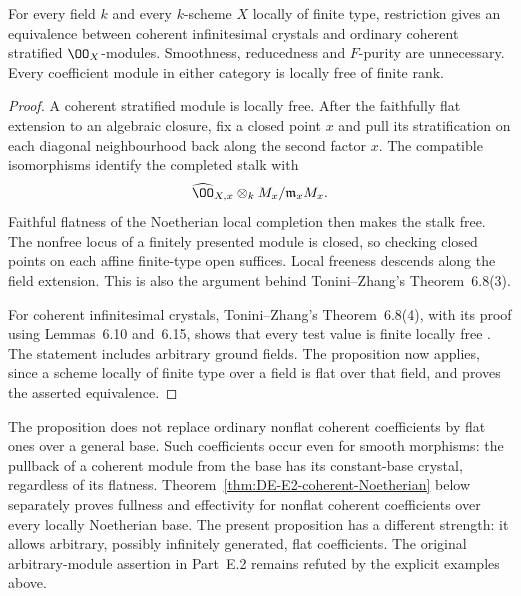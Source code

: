 \begin{corollary}\label{cor:DE-E2-coherent-any-field}
For every field $k$ and every $k$-scheme $X$ locally of finite type, restriction gives an equivalence between coherent infinitesimal crystals and ordinary coherent stratified $\OO_X$-modules.  Smoothness, reducedness and $F$-purity are unnecessary.  Every coefficient module in either category is locally free of finite rank.
\end{corollary}
\begin{proof}
A coherent stratified module is locally free.  After the faithfully flat extension to an algebraic closure, fix a closed point $x$ and pull its stratification on each diagonal neighbourhood back along the second factor $x$.  The compatible isomorphisms identify the completed stalk with
\[
        \widehat{\OO}_{X,x}\otimes_k M_x/\mathfrak m_xM_x.
\]
Faithful flatness of the Noetherian local completion then makes the stalk free.  The nonfree locus of a finitely presented module is closed, so checking closed points on each affine finite-type open suffices.  Local freeness descends along the field extension.  This is also the argument behind Tonini--Zhang's Theorem~6.8(3).

For coherent infinitesimal crystals, Tonini--Zhang's Theorem~6.8(4), with its proof using Lemmas~6.10 and~6.15, shows that every test value is finite locally free \citep{ToniniZhang2019}.  The statement includes arbitrary ground fields.  The proposition now applies, since a scheme locally of finite type over a field is flat over that field, and proves the asserted equivalence.
\end{proof}

\begin{remark}\label{rem:DE-E2-flat-Noetherian-scope}
The proposition does not replace ordinary nonflat coherent coefficients by flat ones over a general base.  Such coefficients occur even for smooth morphisms: the pullback of a coherent module from the base has its constant-base crystal, regardless of its flatness.  Theorem~\ref{thm:DE-E2-coherent-Noetherian} below separately proves fullness and effectivity for nonflat coherent coefficients over every locally Noetherian base.  The present proposition has a different strength: it allows arbitrary, possibly infinitely generated, flat coefficients.  The original arbitrary-module assertion in Part~E.2 remains refuted by the explicit examples above.
\end{remark}

